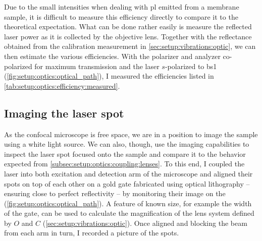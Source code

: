 Due to the small intensities when dealing with \gls{pl} emitted from a membrane sample, it is difficult to measure this efficiency directly to compare it to the theoretical expectation.
What can be done rather easily is measure the reflected laser power as it is collected by the objective lens.
Together with the reflectance obtained from the calibration measurement in \cref{sec:setup:vibrations:optic}, we can then estimate the various efficiencies.
With the polarizer and analyzer co-polarized for maximum transmission and the laser $s$-polarized \wrt to \gls{bs}1 (\cf \cref{fig:setup:optics:optical_path}), I measured the efficiencies listed in \cref{tab:setup:optics:efficiency:measured}.

\subsection{Imaging the laser spot}\label{subsec:setup:optics:coupling:imaging}
As the confocal microscope is free space, we are in a position to image the sample using a white light source.
We can also, though, use the imaging capabilities to inspect the laser spot focused onto the sample and compare it to the behavior expected from \cref{subsec:setup:optics:coupling:lenses}.
To this end, I coupled the laser into both excitation and detection arm of the microscope and aligned their spots on top of each other on a gold gate fabricated using optical lithography -- ensuring close to perfect reflectivity -- by monitoring their image on the \cmoscam (\cf \cref{fig:setup:optics:optical_path}).
A feature of known size, for example the width of the gate, can be used to calculate the magnification of the lens system defined by $O$ and $C$ (\cf \cref{sec:setup:vibrations:optic}).
Once aligned and blocking the beam from each arm in turn, I recorded a picture of the spots.

